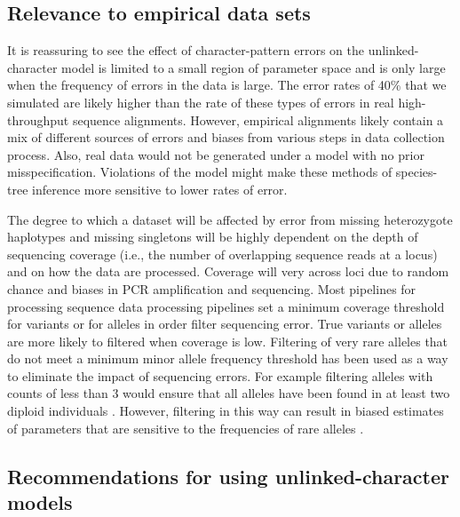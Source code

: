 \subsection{Relevance to empirical data sets}
It is reassuring to see the effect of character-pattern errors on the
unlinked-character model is limited to a small region of parameter space and is
only large when the frequency of errors in the data is large.
The error rates of 40\% that we simulated are likely higher than the rate of
these types of errors in real high-throughput sequence alignments.
However, empirical alignments likely contain a mix of different sources of
errors and biases from various steps in data collection process.
Also, real data would not be generated under a model with no prior misspecification.
Violations of the model might make these methods of species-tree inference more
sensitive to lower rates of error.

The degree to which a dataset will be affected by error from missing
heterozygote haplotypes and missing singletons will be highly dependent on the
depth of sequencing coverage (i.e., the number of overlapping sequence reads at
a locus) and on how the data are processed. 
Coverage will very across loci due to random chance and biases in PCR
amplification and sequencing.
Most pipelines for processing sequence data processing pipelines set 
a minimum coverage threshold for variants or for alleles in order filter
sequencing error. True variants or alleles are more likely to filtered when
coverage is low. 
Filtering of very rare alleles that do not meet a minimum minor allele 
frequency threshold has been used as a way to eliminate the impact of 
sequencing errors. 
For example filtering alleles with counts of less than 3 would ensure that all
alleles have been found in at least two diploid individuals
\citep{rochetteStacksAnalyticalMethods2019}.
However, filtering in this way can result in biased estimates of parameters that
are sensitive to the frequencies of rare alleles
\citep{linckMinorAlleleFrequency2019}.

\subsection{Recommendations for using unlinked-character models}

